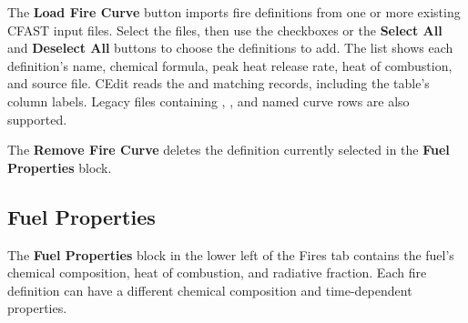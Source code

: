 {{The \textbf{Load Fire Curve} button imports fire definitions from one or more existing CFAST input files. Select the files, then use the checkboxes or the \textbf{Select All} and \textbf{Deselect All} buttons to choose the definitions to add. The list shows each definition's name, chemical formula, peak heat release rate, heat of combustion, and source file. CEdit reads the  and matching  records, including the table's column labels. Legacy files containing , , and named curve rows are also supported.

The \textbf{Remove Fire Curve} deletes the definition currently selected in the \textbf{Fuel Properties} block.

\subsection{Fuel Properties}
\label{info:CHEM}

The \textbf{Fuel Properties} block in the lower left of the Fires tab contains the fuel's chemical composition, heat of combustion, and radiative fraction. Each fire definition can have a different chemical composition and time-dependent properties.

}}
